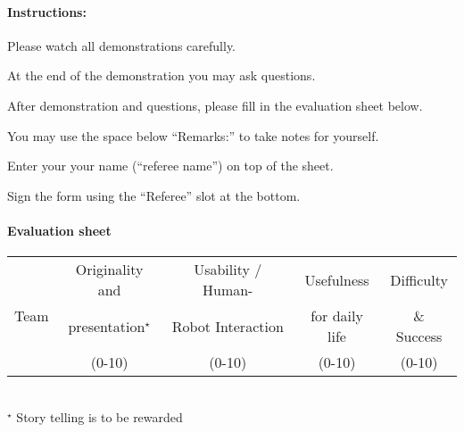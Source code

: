 \paragraph{Instructions:}
\begin{compactenum}
\item Please watch all demonstrations carefully.
\item At the end of the demonstration you may ask questions.
\item After demonstration and questions, please fill in the evaluation sheet below.
\item You may use the space below ``Remarks:'' to take notes for yourself.
\item Enter your your name (``referee name'') on top of the sheet.
\item Sign the form using the ``Referee'' slot at the bottom.
\end{compactenum}


\paragraph{Evaluation sheet}
\begin{center}

\begingroup
\newcommand\tableTEAMS{}
\def\do#1{\appto\tableTEAMS{#1 & & & &  \\\hline}}%
\expandafter\docsvlist\expandafter{\TEAMSFINALS}

\begin{tabular}{|l|c|c|c|c|}
  \hline
  \multirow{3}{*}{Team}
  & Originality and        &  Usability / Human-  &  Usefulness      & Difficulty  \\
  & presentation${}^\star$ & Robot Interaction    &  for daily life  & \& Success  \\
  & (0-10)                 &  (0-10)              &  (0-10)          & (0-10) \\
  \hline
  \hline
  \tableTEAMS
\end{tabular}\\
${}^\star$ Story telling is to be rewarded
\endgroup
\end{center}

